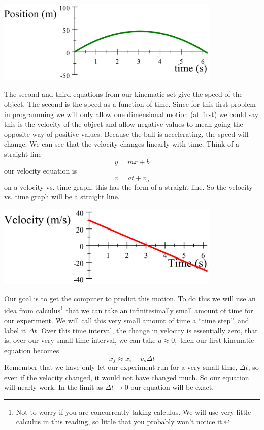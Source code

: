 \documentclass[twoside,11pt,ShortChapTitles]{BYUTextbook}
\begin{document}
 
\begin{center}
\includegraphics[width=0.8\textwidth]{Lab7_figs/PvTSimple.png}
\end{center}
The second and third equations from our kinematic set give the speed of the
object. The second is the speed as a function of time. Since for this first
problem in programming we will only allow one dimensional motion (at first) we
could say this is the velocity of the object and allow negative values to mean
going the opposite way of positive values. Because the ball is accelerating,
the speed will change. We can see that the velocity changes linearly with
time. Think of a straight line
\[
y=mx+b
\]
our velocity equation is
\[
v=at+v_{o}
\]
on a velocity vs. time graph, this has the form of a straight line. So the
velocity vs. time graph will be a straight line. 
\begin{center}
\includegraphics[width=0.8\textwidth]{Lab7_figs/VvTSimple.png}
\end{center}


Our goal is to get the computer to predict this motion. To do this we will use
an idea from calculus\footnote{Not to worry if you are concurrently taking
calculus. We will use very little calculus in this reading, so little that you
probably won't notice it.} that we can take an infinitesimally small amount of
time for our experiment. We will call this very small amount of time a
\textquotedblleft time step\textquotedblright\ and label it $\Delta t.$ Over
this time interval, the change in velocity is essentially zero, that is, over
our very small time interval, we can take $a\approx0,$ then our first
kinematic equation becomes
\[
x_{f}\approx x_{i}+v_{o}\Delta t
\]
Remember that we have only let our experiment run for a very small time,
$\Delta t$, so even if the velocity changed, it would not have changed much.
So our equation will nearly work. In the limit as $\Delta t\rightarrow0$ our
equation will be exact.
\end{document}
